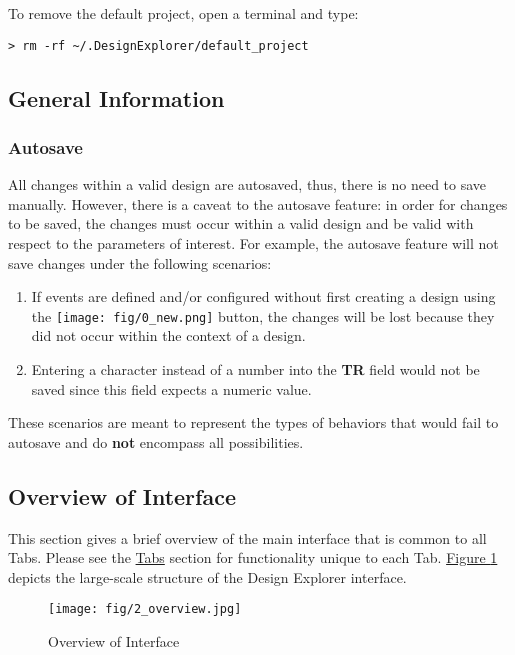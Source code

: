 \documentclass[10pt]{article}
\newcommand*{\nbut}{\texttt{[image: fig/0\_new.png]}}
\begin{document}
			To remove the default project, open a terminal and type:
\begin{lstlisting}
> rm -rf ~/.DesignExplorer/default_project
\end{lstlisting}

	\subsection*{General Information}
	\label{subsec:general}

		\subsubsection*{Autosave}
		\label{subsubsec:save}
			All changes within a valid design are autosaved, thus, there is no need to save manually.
			However, there is a caveat to the autosave feature: in order for changes to be saved, the changes must occur within a valid design and be valid with respect to the parameters of interest.
			For example, the autosave feature will not save changes under the following scenarios:
			\begin{enumerate}
				\item If events are defined and/or configured without first creating a design using the \nbut{} button, the changes will be lost because they did not occur within the context of a design.
				\item Entering a character instead of a number into the \textbf{TR} field would not be saved since this field expects a numeric value.
			\end{enumerate}

			These scenarios are meant to represent the types of behaviors that would fail to autosave and do \textbf{not} encompass all possibilities.

	\subsection*{Overview of Interface}
	\label{subsec:overview}
		This section gives a brief overview of the main interface that is common to all Tabs.
		Please see the \hyperref[subsec:tabs]{Tabs} section for functionality unique to each Tab.
		\hyperref[fig:overview]{Figure \ref{fig:overview}} depicts the large-scale structure of the Design Explorer interface.
		\begin{figure}[ht]
			\centering
			\texttt{[image: fig/2\_overview.jpg]}
			\caption{Overview of Interface}
			\label{fig:overview}
		\end{figure}
\end{document}

